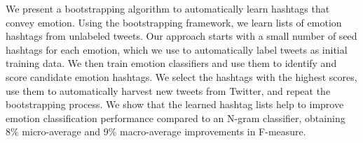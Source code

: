 We present a bootstrapping algorithm to automatically learn hashtags that convey emotion.
 Using the bootstrapping framework, we
 learn lists of emotion hashtags from unlabeled
 tweets. Our approach starts with a small number
 of seed hashtags for each emotion, which
 we use to automatically label tweets as initial
 training data. We then train emotion classifiers
 and use them to identify and score candidate
 emotion hashtags. We select the hashtags
 with the highest scores, use them to automatically
 harvest new tweets from Twitter, and
 repeat the bootstrapping process. We show
 that the learned hashtag lists help to improve
 emotion classification performance compared
 to an N-gram classifier, obtaining 8\% micro-average
 and 9\% macro-average improvements
 in F-measure.

